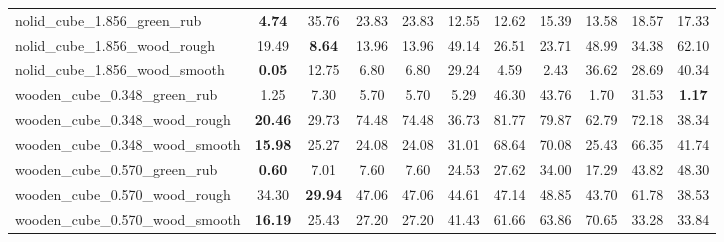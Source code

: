 \begin{table}[H]
{\begin{tabular}{l cccccccccc}
        nolid\_cube\_1.856\_green\_rub & \textbf{4.74} & 35.76 & 23.83 & 23.83 & 12.55 & 12.62 & 15.39 & 13.58 & 18.57 & 17.33 \\
        nolid\_cube\_1.856\_wood\_rough & 19.49 & \textbf{8.64} & 13.96 & 13.96 & 49.14 & 26.51 & 23.71 & 48.99 & 34.38 & 62.10 \\
        nolid\_cube\_1.856\_wood\_smooth & \textbf{0.05} & 12.75 & 6.80 & 6.80 & 29.24 & 4.59 & 2.43 & 36.62 & 28.69 & 40.34 \\
        wooden\_cube\_0.348\_green\_rub & 1.25 & 7.30 & 5.70 & 5.70 & 5.29 & 46.30 & 43.76 & 1.70 & 31.53 & \textbf{1.17} \\
        wooden\_cube\_0.348\_wood\_rough & \textbf{20.46} & 29.73 & 74.48 & 74.48 & 36.73 & 81.77 & 79.87 & 62.79 & 72.18 & 38.34 \\
        wooden\_cube\_0.348\_wood\_smooth & \textbf{15.98} & 25.27 & 24.08 & 24.08 & 31.01 & 68.64 & 70.08 & 25.43 & 66.35 & 41.74 \\
        wooden\_cube\_0.570\_green\_rub & \textbf{0.60} & 7.01 & 7.60 & 7.60 & 24.53 & 27.62 & 34.00 & 17.29 & 43.82 & 48.30 \\
        wooden\_cube\_0.570\_wood\_rough & 34.30 & \textbf{29.94} & 47.06 & 47.06 & 44.61 & 47.14 & 48.85 & 43.70 & 61.78 & 38.53 \\
        wooden\_cube\_0.570\_wood\_smooth & \textbf{16.19} & 25.43 & 27.20 & 27.20 & 41.43 & 61.66 & 63.86 & 70.65 & 33.28 & 33.84 \\
        \bottomrule
    \end{tabular}
    }
\end{table}



\vspace{1cm}

\clearpage


